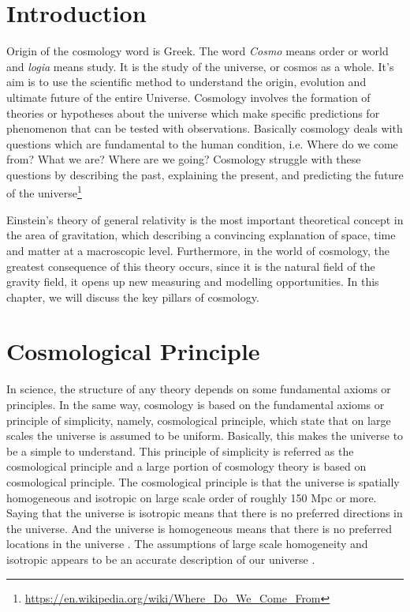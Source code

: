 \documentclass[12pt]{report}
\begin{document}
\section{Introduction}
Origin of the cosmology word is Greek. The word \textit{Cosmo} means  order or world and \textit{logia} means study. It is the study of the universe, or cosmos as a whole. It's aim is to use the scientific method to understand the origin, evolution and ultimate future of the entire Universe. Cosmology involves the formation of theories or hypotheses about the universe which make specific predictions for phenomenon that can be tested with observations. Basically cosmology deals with questions which are fundamental to the human condition, i.e. Where do we come from? What we are? Where are we going? Cosmology struggle with these questions by describing the past, explaining the present, and predicting the future of the universe\footnote{\url{https://en.wikipedia.org/wiki/Where_Do_We_Come_From}}

Einstein's theory of general relativity is the most important theoretical concept in the area of gravitation, which describing a convincing explanation of space, time and matter at a macroscopic level. Furthermore, in the world of cosmology, the greatest consequence of this theory occurs, since it is the natural field of the gravity field, it opens up new measuring and modelling opportunities. In this chapter, we will discuss the key pillars of cosmology.


\section{Cosmological Principle}
In science, the structure of any theory depends on some fundamental axioms or principles. In the same way, cosmology is based on the fundamental axioms or principle of simplicity, namely, cosmological principle, which state that on large scales the universe is assumed to be uniform. Basically, this makes the universe to be a simple to understand. This principle of simplicity is referred as the cosmological principle and a large portion of cosmology theory is based on cosmological principle. The cosmological principle is that the universe is spatially homogeneous and isotropic on large scale order of roughly 150 Mpc or more. Saying that the universe is isotropic means that there is no preferred directions in the universe. And the universe is homogeneous means that there is no preferred locations in the universe \cite{rk2000}. The assumptions of large scale homogeneity and isotropic appears to be an accurate description of our universe \cite{jc2014}.\\
\end{document}
